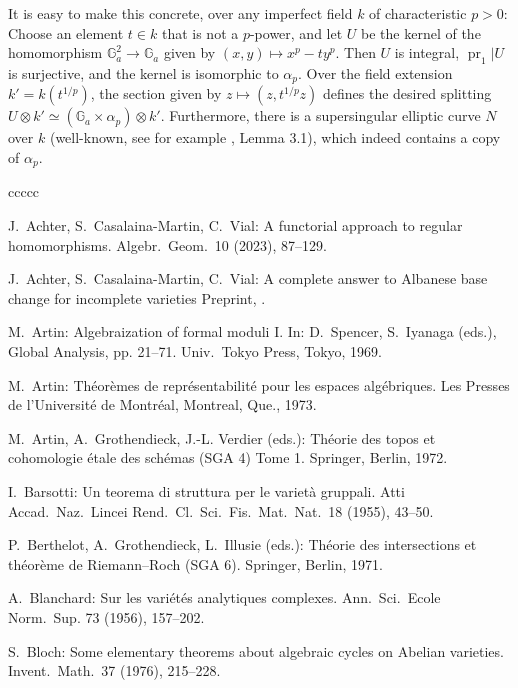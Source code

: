 \documentclass[oneside, 12pt]{amsart}
\theoremstyle{definition}
\theoremstyle{remark}
\newcommand{\GG}{\mathbb{G}}
\newcommand{\pr}{\operatorname{pr}}
\newcommand{\ra}{\rightarrow}
\begin{document}
\medskip
It is   easy to make this concrete,  over any imperfect field $k$ of characteristic $p>0$:
Choose an element $t\in k$ that is not a $p$-power, and let $U$ be the kernel of the homomorphism
$\GG_a^2\ra \GG_a$ given by $(x,y)\mapsto x^p-ty^p$.
Then $U$ is integral,  $\pr_1|U$ is surjective, and the kernel is isomorphic to $\alpha_p$.
Over the field extension $k'=k(t^{1/p})$,   the section given by $z\mapsto (z,t^{1/p}z)$ 
defines the desired splitting $U\otimes k'\simeq (\GG_a\times \alpha_p)\otimes k'$.
Furthermore, there is a supersingular elliptic curve $N$ over $k$ (well-known, see for example \cite{Roessler; Schroeer 2022}, Lemma 3.1),
which indeed contains a copy of $\alpha_p$.


\begin{thebibliography}{ccccc}

J.\ Achter, S.\ Casalaina-Martin, C.\ Vial:
A functorial approach to regular homomorphisms.
Algebr.\ Geom.\ 10 (2023),  87--129. 

J.\ Achter, S.\ Casalaina-Martin, C.\ Vial:
A complete answer to Albanese base change for incomplete varieties
Preprint, .

M.\ Artin: 
Algebraization of formal moduli I. 
In:  
D.\ Spencer, S.\ Iyanaga (eds.),
Global Analysis, pp. 21--71.
Univ.\ Tokyo Press, Tokyo, 1969. 

M.\ Artin: 
Th\'eor\`emes de repr\'esentabilit\'e pour les espaces alg\'ebriques.
Les Presses de l'Universit\'e de Montr\'eal, Montreal, Que., 1973.

M.\ Artin, A.\ Grothendieck, J.-L. Verdier (eds.):
Th\'eorie des topos et cohomologie \'etale des sch\'emas (SGA 4) Tome 1.
Springer, Berlin, 1972.

I.\ Barsotti:
Un teorema di struttura per le variet\`a gruppali. 
Atti Accad.\ Naz.\ Lincei Rend.\ Cl.\ Sci.\ Fis.\ Mat.\ Nat.\  18 (1955), 43--50. 

P.\ Berthelot, A.\ Grothendieck, L.\ Illusie (eds.):
Th\'eorie des intersections et th\'eor\`eme de Riemann--Roch (SGA 6).
Springer, Berlin, 1971.

A.\ Blanchard:
Sur les vari\'et\'es analytiques complexes.  
Ann.\ Sci.\ Ecole Norm.\ Sup. 73 (1956), 157--202. 

S.\ Bloch:
Some elementary theorems about algebraic cycles on Abelian varieties. 
Invent.\ Math.\ 37 (1976),  215--228. 


\end{thebibliography}
\end{document}
